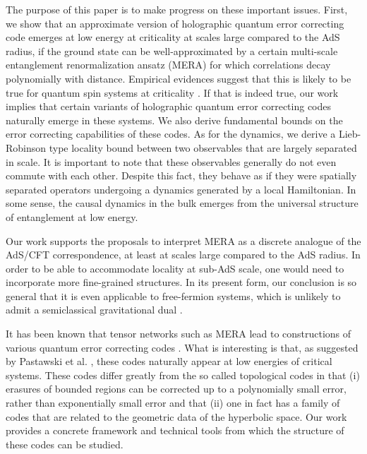 \documentclass[a4paper,11pt]{article}
\newcommand{\1}{\mathbbm{1}}
\begin{document}
The purpose of this paper is to make progress on these important issues.
First, we show that an approximate version of holographic quantum error correcting code emerges
at low energy at criticality at scales large compared to the AdS radius, if the ground state can be well-approximated by a certain multi-scale entanglement renormalization ansatz (MERA) \cite{Vidal2007} for which correlations
decay polynomially with distance. Empirical evidences suggest that this is likely to be true for quantum spin systems at criticality \cite{Pfeifer2009}. If that is indeed
true, our work implies that certain variants of holographic quantum error correcting codes naturally emerge in these systems. We also derive fundamental bounds on the error correcting capabilities of these codes.
As for the dynamics, we derive a Lieb-Robinson
type locality bound \cite{Lieb1972} between two observables that are largely separated in scale. It is important to note that these observables generally do not even
commute with each other. Despite this fact, they behave as if they were spatially separated operators undergoing a dynamics generated by a
local Hamiltonian. In some sense, the causal dynamics in the bulk emerges from the universal structure of entanglement at low energy.

Our work supports the proposals to interpret MERA as a discrete analogue of the AdS/CFT correspondence\cite{Swingle2012,Swingle2012a,Qi2013,Miyaji2015}, at least at scales large compared to the AdS radius.
In order to be able to accommodate locality at sub-AdS scale, one would need to incorporate more fine-grained structures. In its present form, our conclusion is so general
that it is even applicable to free-fermion systems, which is unlikely to admit a semiclassical gravitational dual \cite{Castro2012}.

It has been known that
tensor networks such as MERA lead to constructions of various quantum error correcting codes \cite{Ferris2014}. What is interesting is that, as suggested by Pastawski et al. \cite{Pastawski2016},
these codes naturally appear at low energies of critical systems. These codes differ greatly from the so called topological codes\cite{Kitaev1997} in that (i) erasures of bounded regions can be
corrected up to a polynomially small error, rather than exponentially small error and that (ii) one in fact has a family of codes that are related to the geometric data of the
hyperbolic space. Our work provides a concrete framework and technical tools from which the structure of these codes can be studied.
\end{document}
